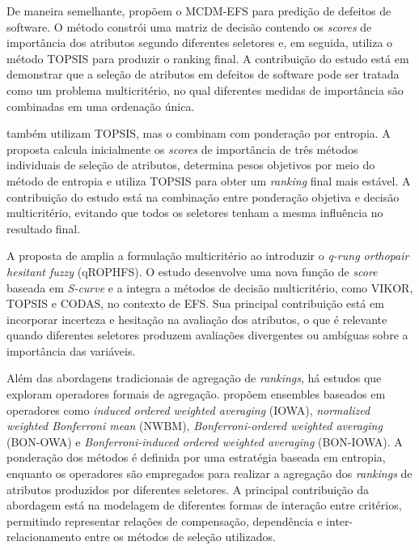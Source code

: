 De maneira semelhante,  propõem o MCDM-EFS para predição de defeitos de software. O método constrói uma matriz de decisão contendo os \textit{scores} de importância dos atributos segundo diferentes seletores e, em seguida, utiliza o método TOPSIS para produzir o ranking final. A contribuição do estudo está em demonstrar que a seleção de atributos em defeitos de software pode ser tratada como um problema multicritério, no qual diferentes medidas de importância são combinadas em uma ordenação única.

 também utilizam TOPSIS, mas o combinam com ponderação por entropia. A proposta calcula inicialmente os \textit{scores} de importância de três métodos individuais de seleção de atributos, determina pesos objetivos por meio do método de entropia e utiliza TOPSIS para obter um \textit{ranking} final mais estável. A contribuição do estudo está na combinação entre ponderação objetiva e decisão multicritério, evitando que todos os seletores tenham a mesma influência no resultado final.

A proposta de  amplia a formulação multicritério ao introduzir o \textit{q-rung orthopair hesitant fuzzy} (qROPHFS). O estudo desenvolve uma nova função de \textit{score} baseada em \textit{S-curve} e a integra a métodos de decisão multicritério, como VIKOR, TOPSIS e CODAS, no contexto de EFS. Sua principal contribuição está em incorporar incerteza e hesitação na avaliação dos atributos, o que é relevante quando diferentes seletores produzem avaliações divergentes ou ambíguas sobre a importância das variáveis.

Além das abordagens tradicionais de agregação de \textit{rankings}, há estudos que exploram operadores formais de agregação.  propõem ensembles baseados em operadores como \textit{induced ordered weighted averaging} (IOWA), \textit{normalized weighted Bonferroni mean} (NWBM), \textit{Bonferroni-ordered weighted averaging} (BON-OWA) e \textit{Bonferroni-induced ordered weighted averaging} (BON-IOWA). A ponderação dos métodos é definida por uma estratégia baseada em entropia, enquanto os operadores são empregados para realizar a agregação dos \textit{rankings} de atributos produzidos por diferentes seletores. A principal contribuição da abordagem está na modelagem de diferentes formas de interação entre critérios, permitindo representar relações de compensação, dependência e inter-relacionamento entre os métodos de seleção utilizados.

